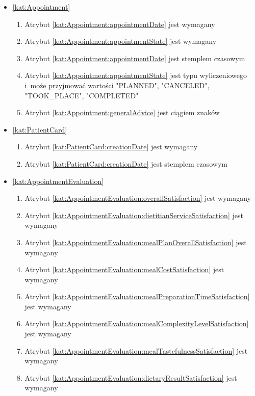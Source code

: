\begin{itemize}[label={\textbf{Ograniczenia dla}}, wide, labelwidth=!, labelindent=0pt]
    \setlength\itemsep{1.75em}
    \item\ref{kat:Appointment}\mynobreakpar
    \begin{enumerate}[label={\textbf{OGR/4/\protect\twodigits{\arabic{enumi}}}}, wide, labelwidth=!, align=left, leftmargin=3cm]
        \item Atrybut \ref{kat:Appointment:appointmentDate} jest wymagany
        \item Atrybut \ref{kat:Appointment:appointmentState} jest wymagany

        \item Atrybut \ref{kat:Appointment:appointmentDate} jest stemplem czasowym
        \item Atrybut \ref{kat:Appointment:appointmentState} jest typu wyliczeniowego i~może przyjmować wartości "PLANNED", "CANCELED", "TOOK\_PLACE", "COMPLETED"
        \item Atrybut \ref{kat:Appointment:generalAdvice} jest ciągiem znaków
    \end{enumerate}

    \item\ref{kat:PatientCard}\mynobreakpar
    \begin{enumerate}[label={\textbf{OGR/4/\protect\twodigits{\arabic{enumi}}}}, wide, labelwidth=!, align=left, leftmargin=3cm, resume]
        \item Atrybut \ref{kat:PatientCard:creationDate} jest wymagany

        \item Atrybut \ref{kat:PatientCard:creationDate} jest stemplem czasowym
    \end{enumerate}

    \item\ref{kat:AppointmentEvaluation}\mynobreakpar
    \begin{enumerate}[label={\textbf{OGR/4/\protect\twodigits{\arabic{enumi}}}}, wide, labelwidth=!, align=left, leftmargin=3cm, resume]
        \item Atrybut \ref{kat:AppointmentEvaluation:overallSatisfaction} jest wymagany
        \item Atrybut \ref{kat:AppointmentEvaluation:dietitianServiceSatisfaction} jest wymagany
        \item Atrybut \ref{kat:AppointmentEvaluation:mealPlanOverallSatisfaction} jest wymagany
        \item Atrybut \ref{kat:AppointmentEvaluation:mealCostSatisfaction} jest wymagany
        \item Atrybut \ref{kat:AppointmentEvaluation:mealPreparationTimeSatisfaction} jest wymagany
        \item Atrybut \ref{kat:AppointmentEvaluation:mealComplexityLevelSatisfaction} jest wymagany
        \item Atrybut \ref{kat:AppointmentEvaluation:mealTastefulnessSatisfaction} jest wymagany
        \item Atrybut \ref{kat:AppointmentEvaluation:dietaryResultSatisfaction} jest wymagany


\end{enumerate}
\end{itemize}
